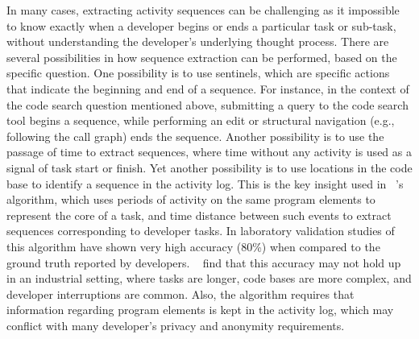 In many cases, extracting activity sequences can be challenging as it impossible to know exactly when a developer begins or ends a particular task or sub-task, without understanding the developer's underlying thought process. There are several possibilities in how sequence extraction can be performed, based on the specific question. One possibility is to use sentinels, which are specific actions that indicate the beginning and end of a sequence. For instance, in the context of the code search question mentioned above, submitting a query to the code search tool begins a sequence, while performing an edit or structural navigation (e.g., following the call graph) ends the sequence. Another possibility is to use the passage of time to extract sequences, where time without any activity is used as a signal of task start or finish. Yet another possibility is to use locations in the code base to identify a sequence in the activity log. This is the key insight used in  ~\citet{Coman-TaskIdent}'s algorithm, which uses periods of activity on the same program elements to represent the core of a task, and time distance between such events to extract sequences corresponding to developer tasks. In laboratory validation studies of this algorithm have shown very high accuracy (80\%) when compared to the ground truth reported by developers. ~\citet{Zou-ComanIndustry} find that this accuracy may not hold up in an industrial setting, where tasks are longer, code bases are more complex, and developer interruptions are common. Also, the algorithm requires that information regarding program elements is kept in the activity log, which may conflict with many developer's privacy and anonymity requirements.



